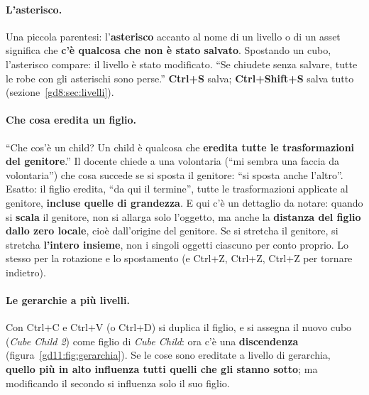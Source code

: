 \paragraph{L'asterisco.} Una piccola parentesi: l'\textbf{asterisco} accanto al
nome di un livello o di un asset significa che \textbf{c'è qualcosa che non è
stato salvato}. Spostando un cubo, l'asterisco compare: il livello è stato
modificato. ``Se chiudete senza salvare, tutte le robe con gli asterischi sono
perse.'' \textbf{Ctrl+S} salva; \textbf{Ctrl+Shift+S} salva tutto
(sezione~\ref{gd8:sec:livelli}).

\paragraph{Che cosa eredita un figlio.} ``Che cos'è un child? Un child è
qualcosa che \textbf{eredita tutte le trasformazioni del genitore}.'' Il docente
chiede a una volontaria (``mi sembra una faccia da volontaria'') che cosa
succede se si sposta il genitore: ``si sposta anche l'altro''. Esatto: il figlio
eredita, ``da qui il termine'', tutte le trasformazioni applicate al genitore,
\textbf{incluse quelle di grandezza}. E qui c'è un dettaglio da notare: quando
si \textbf{scala} il genitore, non si allarga solo l'oggetto, ma anche la
\textbf{distanza del figlio dallo zero locale}, cioè dall'origine del genitore.
Se si stretcha il genitore, si stretcha \textbf{l'intero insieme}, non i singoli
oggetti ciascuno per conto proprio. Lo stesso per la rotazione e lo spostamento
(e Ctrl+Z, Ctrl+Z, Ctrl+Z per tornare indietro).

\paragraph{Le gerarchie a più livelli.} Con Ctrl+C e Ctrl+V (o Ctrl+D) si
duplica il figlio, e si assegna il nuovo cubo (\emph{Cube Child 2}) come figlio
di \emph{Cube Child}: ora c'è una \textbf{discendenza}
(figura~\ref{gd11:fig:gerarchia}). Se le cose sono ereditate a livello di
gerarchia, \textbf{quello più in alto influenza tutti quelli che gli stanno
sotto}; ma modificando il secondo si influenza solo il suo figlio.

